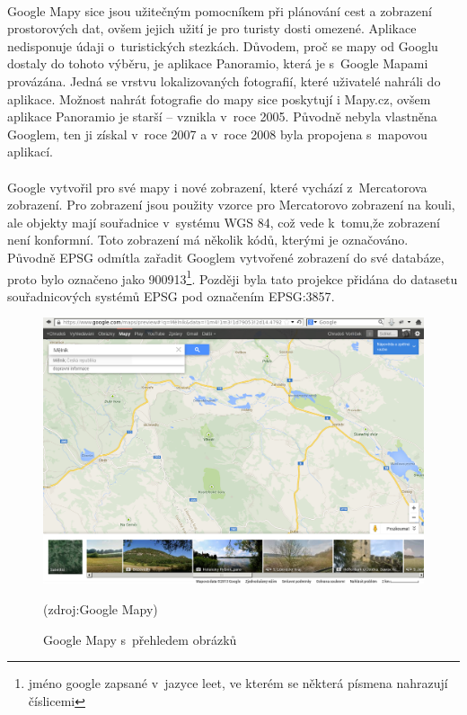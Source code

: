\documentclass[11pt,a4paper,titlepage,oneside]{book}
\begin{document}

		\paragraph{} Google Mapy sice jsou užitečným pomocníkem při plánování cest a zobrazení prostorových dat, ovšem jejich užití je pro turisty dosti omezené. Aplikace nedisponuje údaji o~turistických stezkách. Důvodem, proč se mapy od Googlu dostaly do tohoto výběru, je aplikace Panoramio, která je s~Google Mapami provázána. Jedná se vrstvu lokalizovaných fotografií, které uživatelé nahráli do aplikace. Možnost nahrát fotografie do mapy sice poskytují i  Mapy.cz, ovšem aplikace Panoramio je starší -- vznikla v~roce 2005. Původně nebyla vlastněna Googlem, ten ji získal v~roce 2007 a v~roce 2008 byla propojena s~mapovou aplikací. 


		\paragraph{}  Google vytvořil pro své mapy i nové zobrazení, které vychází z~Mercatorova zobrazení. Pro zobrazení jsou použity vzorce pro Mercatorovo zobrazení na kouli, ale objekty mají  souřadnice v~systému \ac{WGS 84}, což vede k~tomu,že zobrazení není konformní\cite{google_wiki}\label{google_mercator}. Toto zobrazení má několik kódů, kterými je označováno. Původně \ac{EPSG} odmítla zařadit Googlem vytvořené zobrazení do své databáze, proto bylo označeno jako 900913\footnote{jméno google zapsané v~jazyce leet, ve kterém se některá písmena nahrazují číslicemi}. Později byla tato projekce přidána do datasetu souřadnicových systémů \ac{EPSG} pod označením EPSG:3857\cite{sphericalMercator}.

		\begin{figure}[!h]
			\begin{center}
				\includegraphics[width=12cm]{obrazky/googleMaps.png}
				\caption{Google Mapy s~přehledem obrázků}
				(zdroj:Google Mapy\cite{googleMap})
			\end{center}
		\end{figure}
\end{document}
